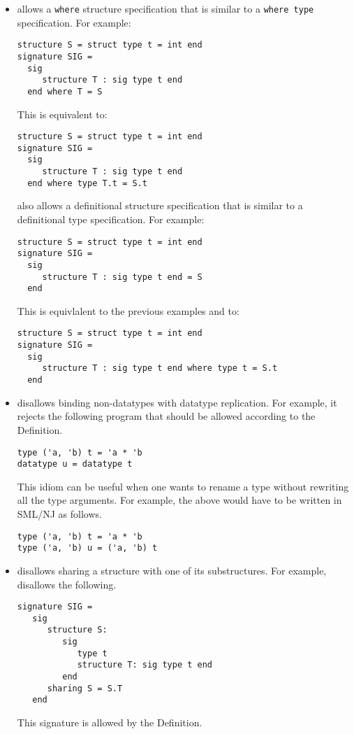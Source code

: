 \begin{itemize}
\item
{\smlnj} allows a {\tt where} structure specification that is similar
to a {\tt where type} specification.  For example:
\begin{verbatim}
structure S = struct type t = int end
signature SIG =
  sig
     structure T : sig type t end
  end where T = S
\end{verbatim}
This is equivalent to:
\begin{verbatim}
structure S = struct type t = int end
signature SIG =
  sig
     structure T : sig type t end
  end where type T.t = S.t
\end{verbatim}
{\smlnj} also allows a definitional structure specification that is
similar to a definitional type specification.  For example:
\begin{verbatim}
structure S = struct type t = int end
signature SIG =
  sig
     structure T : sig type t end = S
  end
\end{verbatim}
This is equivlalent to the previous examples and to:
\begin{verbatim}
structure S = struct type t = int end
signature SIG =
  sig
     structure T : sig type t end where type t = S.t
  end
\end{verbatim}
%
\item
{\smlnj} disallows binding non-datatypes with datatype replication.
For example, it rejects the following program that should be allowed
according to the Definition.
\begin{verbatim}
type ('a, 'b) t = 'a * 'b
datatype u = datatype t
\end{verbatim}
This idiom can be useful when one wants to rename a type without
rewriting all the type arguments.  For example, the above would have
to be written in SML/NJ as follows.
\begin{verbatim}
type ('a, 'b) t = 'a * 'b
type ('a, 'b) u = ('a, 'b) t
\end{verbatim}
%
\item
{\smlnj} disallows sharing a structure with one of its substructures.
For example, {\smlnj} disallows the following.
\begin{verbatim}
signature SIG =
   sig
      structure S:
         sig
            type t
            structure T: sig type t end
         end
      sharing S = S.T
   end
\end{verbatim}
This signature is allowed by the Definition.

\end{itemize}

